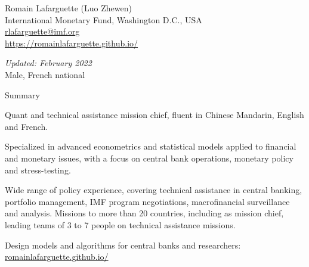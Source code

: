 \documentclass[usegeometry, 10pt, a4paper]{cv} %
\begin{document}
\hspace{10mm}
\begin{chapeau}
\begin{adresse}
\begin{flushleft}
    Romain Lafarguette (Luo Zhewen)\\
    International Monetary Fund, Washington D.C., USA \\
    \href{mailto:rlafarguette@imf.org}{rlafarguette@imf.org}\\
    \url{https://romainlafarguette.github.io/} \\
\end{flushleft}
\end{adresse}
\begin{etatcivil}
\begin{flushleft}
  \emph{Updated: February 2022}\\
Male, French national
\end{flushleft}
\end{etatcivil}
\end{chapeau}

\begin{rubriquetableau}[0.95\textwidth]{Summary}\\
  \vspace{-0.5cm}
    
Quant and technical assistance mission chief, fluent in Chinese Mandarin, English and French.\\
\smallskip

Specialized in advanced econometrics and statistical models applied to
financial and monetary issues, with a focus on central bank operations,
monetary policy and stress-testing.\\ 
\smallskip

Wide range of policy experience, covering technical assistance in central
banking, portfolio management, IMF program negotiations, macrofinancial surveillance and
analysis. Missions to more than 20 countries, including as mission chief, leading teams
of 3 to 7 people on technical assistance missions.\\
\smallskip

Design models and algorithms for central banks and researchers: \url{romainlafarguette.github.io/}\\ 

\end{rubriquetableau}
\end{document}
